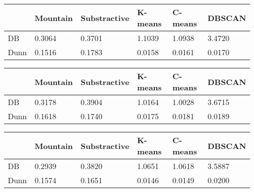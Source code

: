 \begin{table}
    \begin{tabular}{l|lllll}
             & Mountain & Substractive & K-means & C-means & DBSCAN\\\hline
        DB   & 0.3064 & 0.3701 & 1.1039 & 1.0938 & 3.4720\\
        Dunn & 0.1516 & 0.1783 & 0.0158 & 0.0161 & 0.0170
    \end{tabular}
\end{table}

\begin{table}
    \begin{tabular}{l|lllll}
             & Mountain & Substractive & K-means & C-means & DBSCAN\\\hline
        DB   & 0.3178 & 0.3904 & 1.0164 & 1.0028 & 3.6715\\
        Dunn & 0.1618 & 0.1740 & 0.0175 & 0.0181 & 0.0189
    \end{tabular}
\end{table}

\begin{table}
    \begin{tabular}{l|lllll}
             & Mountain & Substractive & K-means & C-means & DBSCAN\\\hline
        DB   & 0.2939 & 0.3820 & 1.0651 & 1.0618 & 3.5887\\
        Dunn & 0.1574 & 0.1651 & 0.0146 & 0.0149 & 0.0200
    \end{tabular}
\end{table}




